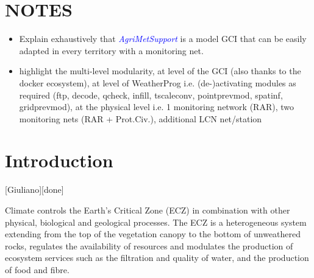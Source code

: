 \documentclass[authoryear,preprint,review,12pt]{elsarticle}
\newcommand{\update}[1]{\emph{\textcolor{blue}{#1}}}
\newcommand{\gci}{\update{AgriMetSupport}\xspace}
\begin{document}
\section{NOTES}
\begin{itemize}
    \item Explain exhaustively that \gci is a model GCI that can be easily adapted in every territory with a monitoring net.
    \item highlight the multi-level modularity, at level of the GCI (also thanks to the docker ecosystem), at level of WeatherProg i.e. (de-)activating modules as required (ftp, decode, qcheck, infill, tscaleconv, pointprevmod, spatinf, gridprevmod), at the physical level i.e. 1 monitoring network (RAR), two monitoring nets (RAR + Prot.Civ.), additional LCN net/station
\end{itemize}






\section{Introduction}[Giuliano][done]



Climate controls the Earth's Critical Zone (ECZ) in combination with other physical, biological and geological processes.
The ECZ is a heterogeneous system extending from the top of the vegetation canopy to the bottom of unweathered rocks, regulates the availability of resources and modulates the production of ecosystem services such as the filtration and quality of water, and the production of food and fibre.
\end{document}
